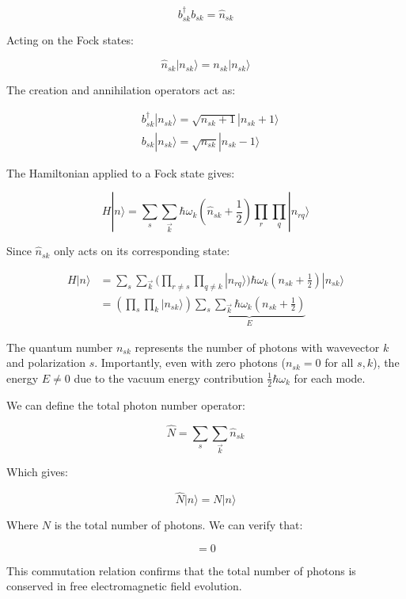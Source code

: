 \documentclass[italian]{HKNdocument}
\begin{document}
\begin{equation*}
b_{sk}^\dagger b_{sk}=\hat{n}_{sk} \tag{15.22}
\end{equation*}

Acting on the Fock states:

\begin{equation*}
\hat{n}_{sk}|n_{sk}\rangle=n_{sk}|n_{sk}\rangle \tag{15.23}
\end{equation*}

The creation and annihilation operators act as:

\begin{align*}
&b_{sk}^\dagger|n_{sk}\rangle=\sqrt{n_{sk}+1}|n_{sk}+1\rangle \tag{15.24}\\
&b_{sk}|n_{sk}\rangle=\sqrt{n_{sk}}|n_{sk}-1\rangle
\end{align*}

The Hamiltonian applied to a Fock state gives:

\begin{equation*}
H|n\rangle=\sum_s\sum_{\vec{k}}\hbar\omega_k(\hat{n}_{sk}+\frac{1}{2})\prod_r\prod_q|n_{rq}\rangle \tag{15.25}
\end{equation*}

Since $\hat{n}_{sk}$ only acts on its corresponding state:

\begin{align*}
H|n\rangle&=\sum_s\sum_{\vec{k}}(\prod_{r\neq s}\prod_{q\neq k}|n_{rq}\rangle)\hbar\omega_k(n_{sk}+\frac{1}{2})|n_{sk}\rangle\\
&=(\prod_s\prod_k|n_{sk}\rangle)\underbrace{\sum_s\sum_{\vec{k}}\hbar\omega_k(n_{sk}+\frac{1}{2})}_E \tag{15.26}
\end{align*}

The quantum number $n_{sk}$ represents the number of photons with wavevector $k$ and polarization $s$. Importantly, even with zero photons ($n_{sk}=0$ for all $s,k$), the energy $E\neq 0$ due to the vacuum energy contribution $\frac{1}{2}\hbar\omega_k$ for each mode.

We can define the total photon number operator:

\begin{equation*}
\hat{N}=\sum_s\sum_{\vec{k}}\hat{n}_{sk} \tag{15.27}
\end{equation*}

Which gives:

\begin{equation*}
\hat{N}|n\rangle=N|n\rangle \tag{15.28}
\end{equation*}

Where $N$ is the total number of photons. We can verify that:

\begin{equation*}
[\hat{N},H]=0 \tag{15.29}
\end{equation*}

This commutation relation confirms that the total number of photons is conserved in free electromagnetic field evolution.

\backmatter

\end{document}
